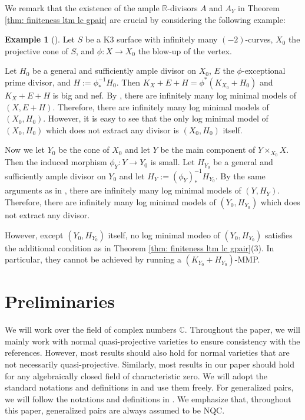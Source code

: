 \documentclass[11pt]{amsart}
\numberwithin{equation}{section}
\newcommand{\Cc}{\mathbb{C}}
\newcommand{\Rr}{\mathbb{R}}
\theoremstyle{definition}
\theoremstyle{definition}
\newtheorem{ex}[thm]{Example}
\theoremstyle{definition}
\begin{document}
We remark that the existence of the ample $\Rr$-divisors $A$ and $A_Y$ in Theorem \ref{thm: finiteness ltm lc gpair} are crucial by considering the following example:

\begin{ex}[{\cite{Gon09}}]
 Let $S$ be a K3 surface with  infinitely many $(-2)$-curves, $X_0$ the projective cone of $S$, and $\phi: X\rightarrow X_0$ the blow-up of the vertex.
 
 Let $H_0$ be a general and sufficiently ample divisor on $X_0$, $E$ the $\phi$-exceptional prime divisor, and $H:=\phi^{-1}_*H_0$. Then $K_X+E+H=\phi^*(K_{X_0}+H_0)$ and $K_X+E+H$ is big and nef.  By \cite[Example 0.3]{Gon09}, there are infinitely many log minimal models of $(X,E+H)$. Therefore, there are infinitely many log minimal models of $(X_0,H_0)$. However, it is easy to see that the only log minimal model of $(X_0,H_0)$ which does not extract any divisor is $(X_0,H_0)$ itself.
 

Now we let $Y_0$ be the cone of $X_0$ and let $Y$ be the main component of $Y\times_{X_0}X$. Then the induced morphism $\phi_Y: Y\rightarrow Y_0$ is small. Let $H_{Y_0}$ be a general and sufficiently ample divisor on $Y_0$ and let $H_Y:=(\phi_Y)^{-1}_*H_{Y_0}$. By the same arguments as in \cite[Example 0.3]{Gon09},  there are infinitely many log minimal models of $(Y,H_Y)$. Therefore, there are infinitely many log minimal models of $(Y_0,H_{Y_0})$ which does not extract any divisor. 

However, except $(Y_0,H_{Y_0})$ itself, no log minimal modeo of $(Y_0,H_{Y_0})$ satisfies the additional condition as in Theorem \ref{thm: finiteness ltm lc gpair}(3). In particular, they cannot be achieved by running a $(K_{Y_0}+H_{Y_0})$-MMP.
\end{ex}


\section{Preliminaries}

We will work over the field of complex numbers $\Cc$. Throughout the paper, we will mainly work with normal quasi-projective varieties to ensure consistency with the references. However, most results should also hold for normal varieties that are not necessarily quasi-projective. Similarly, most results in our paper should hold for any algebraically closed field of characteristic zero. We will adopt the standard notations and definitions in \cite{KM98, BCHM10} and use them freely. For generalized pairs, we will follow the notations and definitions in \cite{HL21}. We emphasize that, throughout this paper, generalized pairs are always assumed to be NQC.
\end{document}
